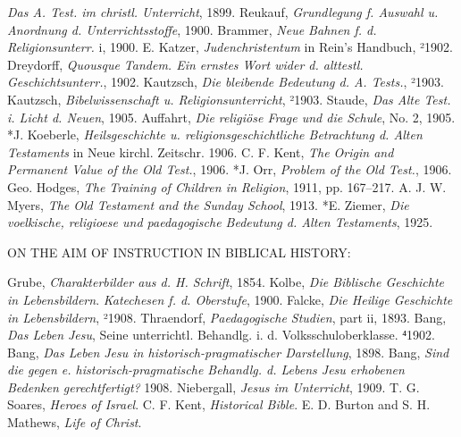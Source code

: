 \emph{Das A. Test. im christl. Unterricht}, 1899. Reukauf, \emph{Grundlegung f. Auswahl u. Anordnung d. Unterrichtsstoffe},
1900. Brammer, \emph{Neue Bahnen f. d. Religionsunterr.} i, 1900. E. Katzer, \emph{Judenchristentum} in Rein’s Handbuch, ²1902. Dreydorff, \emph{Quousque Tandem. Ein ernstes Wort wider d. alttestl. Geschichtsunterr.}, 1902. Kautzsch, \emph{Die bleibende Bedeutung d. A. Tests.}, ²1903. Kautzsch, \emph{Bibelwissenschaft u. Religionsunterricht}, ²1903. Staude, \emph{Das Alte Test. i. Licht d. Neuen}, 1905. Auffahrt, \emph{Die religiöse Frage und die Schule}, No. 2, 1905. *J. Koeberle, \emph{Heilsgeschichte u. religionsgeschichtliche Betrachtung d. Alten Testaments} in Neue kirchl. Zeitschr. 1906. C. F. Kent, \emph{The Origin and Permanent Value of the Old Test.}, 1906. *J. Orr, \emph{Problem of the Old Test.}, 1906. Geo. Hodges, \emph{The Training of Children in Religion}, 1911, pp. 167–217. A. J. W. Myers, \emph{The Old Testament and the Sunday School}, 1913. *E. Ziemer, \emph{Die voelkische, religioese und paedagogische Bedeutung d. Alten Testaments}, 1925.

ON THE AIM OF INSTRUCTION IN BIBLICAL HISTORY:

Grube, \emph{Charakterbilder aus d. H. Schrift}, 1854. Kolbe, \emph{Die Biblische Geschichte in Lebensbildern}. \emph{Katechesen f. d. Oberstufe}, 1900. Falcke, \emph{Die Heilige Geschichte in Lebensbildern}, ²1908. Thraendorf, \emph{Paedagogische Studien}, part ii, 1893. Bang, \emph{Das Leben Jesu}, Seine unterrichtl. Behandlg. i. d. Volksschuloberklasse. ⁴1902. Bang, \emph{Das Leben Jesu in historisch-pragmatischer Darstellung}, 1898. Bang, \emph{Sind die gegen e. historisch-pragmatische Behandlg. d. Lebens Jesu erhobenen Bedenken gerechtfertigt?} 1908. Niebergall, \emph{Jesus im Unterricht}, 1909. T. G. Soares, \emph{Heroes of Israel}. C. F. Kent, \emph{Historical Bible}. E. D. Burton and S. H. Mathews, \emph{Life of Christ}.


